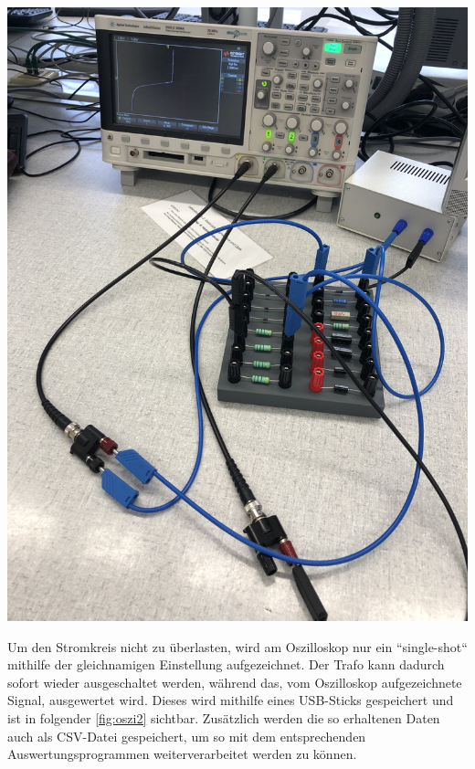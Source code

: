 \documentclass[11pt,ngerman]{scrartcl}
\begin{document}
\begin{center}
	\begin{minipage}[t]{0.5\textwidth}
		\includegraphics[angle=-90,width=\textwidth]{aufbau2}
		\label{fig:aufbau2}
	\end{minipage}
\end{center}

Um den Stromkreis nicht zu überlasten, wird am Oszilloskop nur ein ``single-shot`` mithilfe der gleichnamigen Einstellung aufgezeichnet. Der Trafo kann dadurch sofort wieder ausgeschaltet werden, während das, vom Oszilloskop aufgezeichnete Signal, ausgewertet wird. Dieses wird mithilfe eines USB-Sticks gespeichert und ist in folgender \autoref{fig:oszi2} sichtbar. Zusätzlich werden die so erhaltenen Daten auch als CSV-Datei gespeichert, um so mit dem entsprechenden Auswertungsprogrammen weiterverarbeitet werden zu können.
\end{document}
